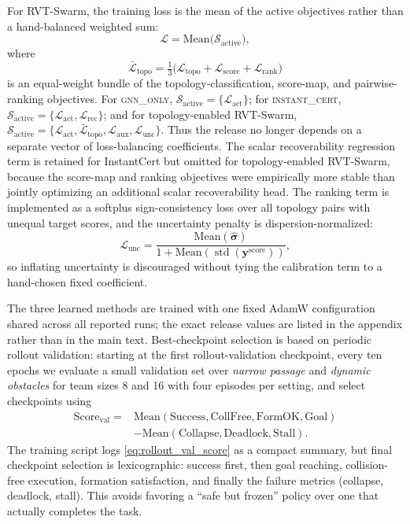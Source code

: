 \documentclass[journal]{IEEEtran}
\begin{document}
For RVT-Swarm, the training loss is the mean of the active objectives
rather than a hand-balanced weighted sum:
\begin{equation}
\mathcal{L} = \mathrm{Mean}\bigl(\mathcal{S}_{\mathrm{active}}\bigr),
\label{eq:loss}
\end{equation}
where
\begin{equation}
\bar{\mathcal{L}}_{\text{topo}}
= \tfrac{1}{3}\bigl(
\mathcal{L}_{\text{topo}}
+ \mathcal{L}_{\text{score}}
+ \mathcal{L}_{\text{rank}}
\bigr)
\end{equation}
is an equal-weight bundle of the topology-classification, score-map, and
pairwise-ranking objectives. For \textsc{gnn\_only},
$\mathcal{S}_{\mathrm{active}}=\{\mathcal{L}_{\text{act}}\}$; for
\textsc{instant\_cert},
$\mathcal{S}_{\mathrm{active}}=\{\mathcal{L}_{\text{act}},
\mathcal{L}_{\text{rec}}\}$; and for topology-enabled RVT-Swarm,
$\mathcal{S}_{\mathrm{active}}=\{\mathcal{L}_{\text{act}},
\bar{\mathcal{L}}_{\text{topo}}, \mathcal{L}_{\text{aux}},
\mathcal{L}_{\text{unc}}\}$. Thus the release no longer depends on a
separate vector of loss-balancing coefficients. The scalar
recoverability regression term is retained for InstantCert but omitted
for topology-enabled RVT-Swarm, because the score-map and ranking
objectives were empirically more stable than jointly optimizing an
additional scalar recoverability head. The ranking term is implemented
as a softplus sign-consistency loss over all topology pairs with unequal
target scores, and the uncertainty penalty is dispersion-normalized:
\begin{equation}
\mathcal{L}_{\text{unc}}
= \frac{\mathrm{Mean}(\hat{\bm{\sigma}})}
       {1 + \mathrm{Mean}(\operatorname{std}(\mathbf{y}^{\mathrm{score}}))},
\end{equation}
so inflating uncertainty is discouraged without tying the calibration
term to a hand-chosen fixed coefficient.

The three learned methods are trained with one fixed AdamW
configuration shared across all reported runs; the exact release values
are listed in the appendix rather than in the main text. Best-checkpoint
selection is based on periodic rollout validation:
starting at the first rollout-validation checkpoint, every ten epochs we
evaluate a small validation set over
\emph{narrow passage} and \emph{dynamic obstacles} for team sizes 8 and
16 with four episodes per setting, and select checkpoints using
\begin{equation}
\begin{aligned}
\mathrm{Score}_{\mathrm{val}} ={}&
\mathrm{Mean}(\mathrm{Success}, \mathrm{CollFree}, \mathrm{FormOK}, \mathrm{Goal}) \\
&- \mathrm{Mean}(\mathrm{Collapse}, \mathrm{Deadlock}, \mathrm{Stall}).
\end{aligned}
\label{eq:rollout_val_score}
\end{equation}
The training script logs \eqref{eq:rollout_val_score} as a compact
summary, but final checkpoint selection is lexicographic:
success first, then goal reaching, collision-free execution, formation
satisfaction, and finally the failure metrics
(collapse, deadlock, stall). This avoids favoring a ``safe but frozen''
policy over one that actually completes the task.
\end{document}
